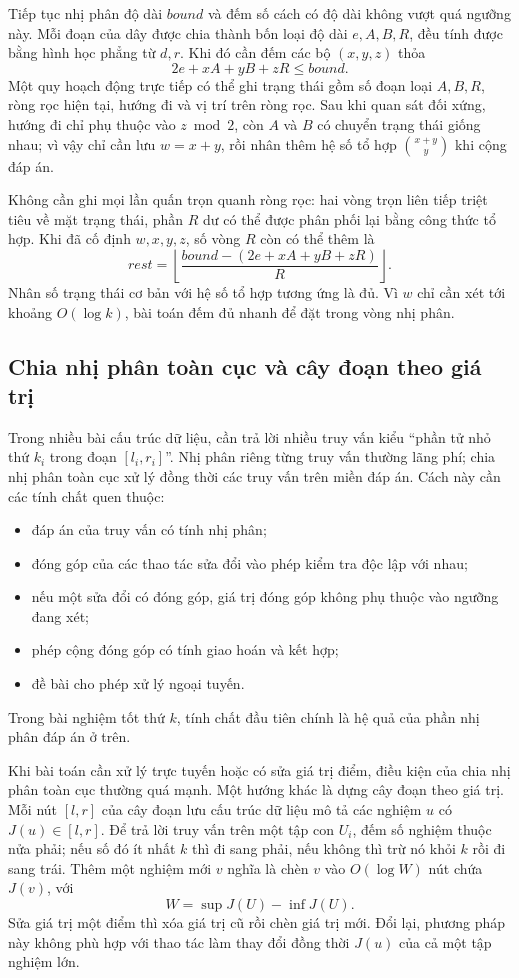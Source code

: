 \documentclass[11pt]{article}
\begin{document}
Tiếp tục nhị phân độ dài \(\mathit{bound}\) và đếm số cách có độ dài không vượt
quá ngưỡng này. Mỗi đoạn của dây được chia thành bốn loại độ dài \(e,A,B,R\),
đều tính được bằng hình học phẳng từ \(d,r\). Khi đó cần đếm các bộ
\((x,y,z)\) thỏa
\[
  2e+xA+yB+zR\le \mathit{bound}.
\]
Một quy hoạch động trực tiếp có thể ghi trạng thái gồm số đoạn loại \(A,B,R\),
ròng rọc hiện tại, hướng đi và vị trí trên ròng rọc. Sau khi quan sát đối xứng,
hướng đi chỉ phụ thuộc vào \(z\bmod 2\), còn \(A\) và \(B\) có chuyển trạng thái
giống nhau; vì vậy chỉ cần lưu \(w=x+y\), rồi nhân thêm hệ số tổ hợp
\(\binom{x+y}{y}\) khi cộng đáp án.

Không cần ghi mọi lần quấn trọn quanh ròng rọc: hai vòng trọn liên tiếp triệt
tiêu về mặt trạng thái, phần \(R\) dư có thể được phân phối lại bằng công thức
tổ hợp. Khi đã cố định \(w,x,y,z\), số vòng \(R\) còn có thể thêm là
\[
  \mathit{rest}=
  \left\lfloor
    \frac{\mathit{bound}-(2e+xA+yB+zR)}{R}
  \right\rfloor.
\]
Nhân số trạng thái cơ bản với hệ số tổ hợp tương ứng là đủ. Vì \(w\) chỉ cần
xét tới khoảng \(O(\log k)\), bài toán đếm đủ nhanh để đặt trong vòng nhị phân.

\subsection{Chia nhị phân toàn cục và cây đoạn theo giá trị}

Trong nhiều bài cấu trúc dữ liệu, cần trả lời nhiều truy vấn kiểu ``phần tử nhỏ
thứ \(k_i\) trong đoạn \([l_i,r_i]\)''. Nhị phân riêng từng truy vấn thường lãng
phí; chia nhị phân toàn cục xử lý đồng thời các truy vấn trên miền đáp án. Cách
này cần các tính chất quen thuộc:
\begin{itemize}
  \item đáp án của truy vấn có tính nhị phân;
  \item đóng góp của các thao tác sửa đổi vào phép kiểm tra độc lập với nhau;
  \item nếu một sửa đổi có đóng góp, giá trị đóng góp không phụ thuộc vào ngưỡng
  đang xét;
  \item phép cộng đóng góp có tính giao hoán và kết hợp;
  \item đề bài cho phép xử lý ngoại tuyến.
\end{itemize}
Trong bài nghiệm tốt thứ \(k\), tính chất đầu tiên chính là hệ quả của phần
nhị phân đáp án ở trên.

Khi bài toán cần xử lý trực tuyến hoặc có sửa giá trị điểm, điều kiện của chia
nhị phân toàn cục thường quá mạnh. Một hướng khác là dựng cây đoạn theo giá trị.
Mỗi nút \([l,r]\) của cây đoạn lưu cấu trúc dữ liệu mô tả các nghiệm \(u\) có
\(J(u)\in[l,r]\). Để trả lời truy vấn trên một tập con \(U_i\), đếm số nghiệm
thuộc nửa phải; nếu số đó ít nhất \(k\) thì đi sang phải, nếu không thì trừ nó
khỏi \(k\) rồi đi sang trái. Thêm một nghiệm mới \(v\) nghĩa là chèn \(v\) vào
\(O(\log W)\) nút chứa \(J(v)\), với
\[
  W=\sup J(U)-\inf J(U).
\]
Sửa giá trị một điểm thì xóa giá trị cũ rồi chèn giá trị mới. Đổi lại, phương
pháp này không phù hợp với thao tác làm thay đổi đồng thời \(J(u)\) của cả một
tập nghiệm lớn.
\end{document}
